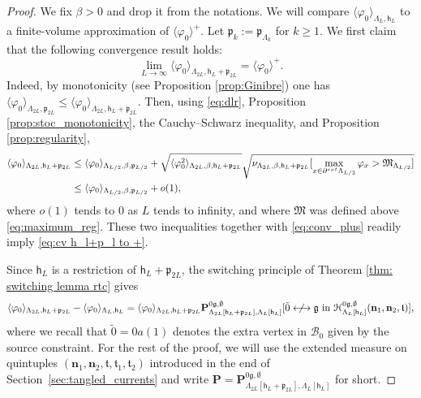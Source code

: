 \documentclass[11pt,a4paper]{article}
\theoremstyle{definition}
\numberwithin{equation}{section}
\newcommand\n{\mathbf{n}}
\newcommand\fg{\mathfrak{g}}
\newcommand\ft{\mathfrak{t}}
\begin{document}
\begin{proof} We fix $\beta>0$ and drop it from the notations. We will compare $\langle \varphi_0\rangle_{\Lambda_L,\mathsf{h}_L}$ to a finite-volume approximation of $\langle \varphi_0\rangle^+$. Let $\mathfrak{p}_k:=\mathfrak{p}_{\Lambda_{k}}$ for $k\geq 1$. 
We first claim that the following convergence result holds: 
\begin{equation}\label{eq:cv h_l+p_l to +}
    \lim_{L\rightarrow \infty}\langle\varphi_0\rangle_{\Lambda_{2L},\mathsf{h}_L+\mathfrak{p}_{2L}}=\langle \varphi_0\rangle^+.
\end{equation}
Indeed, by monotonicity (see Proposition \ref{prop:Ginibre}) one has $\langle \varphi_0\rangle_{\Lambda_{2L},\mathfrak{p}_{2L}}\leq \langle \varphi_0\rangle_{\Lambda_{2L},\mathsf{h}_L+\mathfrak{p}_{2L}}$. Then, using \eqref{eq:dlr}, Proposition \ref{prop:stoc_monotonicity}, the Cauchy--Schwarz inequality, and Proposition \ref{prop:regularity},
\begin{align}
    \langle \varphi_0\rangle_{\Lambda_{2L},\mathsf{h}_L+\mathfrak{p}_{2L}}&\leq\langle \varphi_0\rangle_{\Lambda_{L/2},\beta,\mathfrak{p}_{L/2}}+\sqrt{\langle \varphi_0^2\rangle_{\Lambda_{2L},\beta,\mathsf{h}_L+\mathfrak{p}_{2L}}}\sqrt{\nu_{\Lambda_{2L},\beta,\mathsf{h}_L+\mathfrak{p}_{2L}}[\max_{x \in \partial^{\rm ext} \Lambda_{L/2}} \varphi_x>\mathfrak{M}_{\Lambda_{L/2}}]}\notag
    \\&\leq \langle \varphi_0\rangle_{\Lambda_{L/2},\beta,\mathfrak{p}_{L/2}}+o(1),
\end{align}
where $o(1)$ tends to $0$ as $L$ tends to infinity, and where $\mathfrak{M}$ was defined above \eqref{eq:maximum_reg}. These two inequalities together with \eqref{eq:conv_plus} readily imply \eqref{eq:cv h_l+p_l to +}.

Since $\mathsf{h}_L$ is a restriction of $\mathsf{h}_L+\mathfrak{p}_{2L}$, the switching principle of Theorem \ref{thm: switching lemma rtc} gives
\begin{equation}\label{eq: thick switching}
     \langle \varphi_0\rangle_{\Lambda_{2L},\mathsf{h}_L+\mathfrak{p}_{2L}} - \langle \varphi_0\rangle_{\Lambda_L,\mathsf{h}_L}= \langle \varphi_0\rangle_{\Lambda_{2L},\mathsf{h}_L+\mathfrak{p}_{2L}}\mathbf{P}_{\Lambda_{2L}[\mathsf{h}_L+\mathfrak{p}_{2L}],\Lambda_L[\mathsf{h}_L]}^{0\fg,\emptyset} [\tilde 0 \centernot\longleftrightarrow \fg \text{ in } {\mathcal{H}_{\Lambda_L[\mathsf{h}_L]}^{0\fg,\emptyset}(\n_1,\n_2,\ft)}],
\end{equation}
where we recall that $\tilde{0}=0a(1)$ denotes the extra vertex in $\mathcal{B}_0$ given by the source constraint. For the rest of the proof, we will use the extended measure on quintuples $(\n_1,\n_2,\ft,\ft_1,\ft_2)$ introduced in the end of Section~\ref{sec:tangled_currents} and write $\mathbf{P}=\mathbf{P}_{\Lambda_{2L}[\mathsf{h}_L+\mathfrak{p}_{2L}],\Lambda_L[\mathsf{h}_L]}^{0\fg,\emptyset}$ for short. 


\end{proof}
\end{document}

